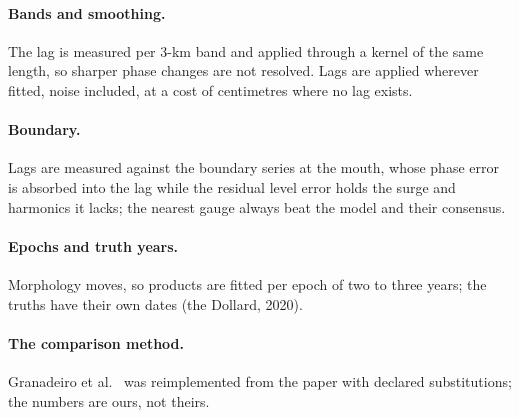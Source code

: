 \paragraph{Bands and smoothing.} The lag is measured per 3-km band and
applied through a kernel of the same length, so sharper phase changes
are not resolved. Lags are applied wherever fitted, noise included, at
a cost of centimetres where no lag exists.

\paragraph{Boundary.} Lags are measured against the boundary series at
the mouth, whose phase error is absorbed into the lag while the residual
level error holds the surge and harmonics it lacks; the nearest gauge
always beat the model and their consensus.

\paragraph{Epochs and truth years.} Morphology moves, so products are
fitted per epoch of two to three years; the truths have their own dates
(the Dollard, 2020).

\paragraph{The comparison method.} Granadeiro et
al.~\cite{granadeiro2021} was reimplemented from the paper with declared
substitutions; the numbers are ours, not theirs.

